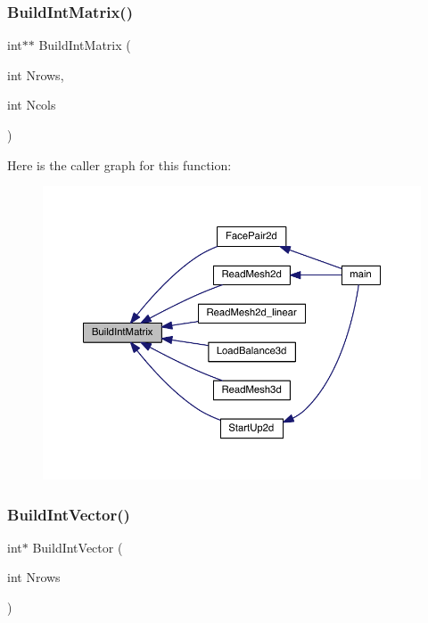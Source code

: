 \mbox{\label{a00602_a77f751d54b396015520a882d7a318e57}} 
\subsubsection{\texorpdfstring{Build\+Int\+Matrix()}{BuildIntMatrix()}}
{\footnotesize\ttfamily int$\ast$$\ast$ Build\+Int\+Matrix (\begin{DoxyParamCaption}\item[{int}]{Nrows,  }\item[{int}]{Ncols }\end{DoxyParamCaption})}

Here is the caller graph for this function\+:\nopagebreak
\begin{figure}[H]
\begin{center}
\leavevmode
\includegraphics[width=350pt]{a00602_a77f751d54b396015520a882d7a318e57_icgraph}
\end{center}
\end{figure}
\mbox{\label{a00602_a0f24d8056fa979af4888469ea90576ff}} 
\subsubsection{\texorpdfstring{Build\+Int\+Vector()}{BuildIntVector()}}
{\footnotesize\ttfamily int$\ast$ Build\+Int\+Vector (\begin{DoxyParamCaption}\item[{int}]{Nrows }\end{DoxyParamCaption})}

